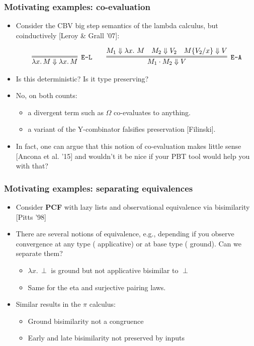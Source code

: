 \documentclass{beamer}
\newcommand{\red}[1]{{\color{red} #1}}
\begin{document}
\begin{frame}
  \frametitle{Motivating examples: co-evaluation}
  \newcommand{\step}{\Downarrow}
  \begin{itemize}
  \item Consider the CBV big step semantics of the lambda calculus,
    but \red{coinductively} [Leroy \& Grall '07]:
    \begin{small}
  \[
  \begin{array}{c}
        \infer=[\texttt{E-L}]{\lambda x.\, M \step \lambda x.\, M}{}
  \qquad
    \infer=[\texttt{E-A}]{M_1\cdot M_2 \step V}{M_1 \step \lambda x.\ M\quad M_2\step V_2\quad  M\{V_2/x\}\step V}
    \end{array}
  \]
\end{small}
\item Is this deterministic? Is it type preserving?
  
\item No, on both counts:
  \begin{itemize}
  \item a divergent term such as $\Omega$ co-evaluates to anything.
  \item a variant of the Y-combinator falsifies preservation [Filinski].
  \end{itemize}
  
\item In fact, one can argue that this notion of co-evaluation makes
  little sense [Ancona et al. '15] and wouldn't it be nice if your PBT
  tool would help you with that?
\end{itemize}
\end{frame}
\begin{frame}
  \frametitle{Motivating examples: separating equivalences}
  \begin{itemize}
  \item Consider  \textbf{PCF} with lazy lists and
    observational equivalence via \red{bisimilarity}
    [Pitts '98]
  \item There are several notions of equivalence, e.g., depending if you observe
    convergence at any type (\red{applicative}) or at base type
    (\red{ground}). Can we separate them?
    \begin{itemize}
    \item $\lambda x.\, \perp$ is \red{ground} but not \red{applicative} bisimilar to $\perp$
    \item Same for the eta and surjective pairing laws. 
      \end{itemize}
 
  \item Similar results in the $\pi$ calculus:
    \begin{itemize}
    \item Ground bisimilarity not a congruence
      \item  Early and late bisimilarity not preserved by inputs
    \end{itemize}
  \end{itemize}
\end{frame}
\end{document}
